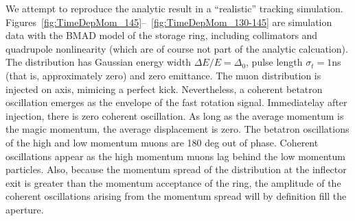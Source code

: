 \documentclass[10pt]{article}
\begin{document}
We attempt to reproduce the analytic result in a ``realistic'' tracking simulation. Figures~\ref{fig:TimeDepMom_145}--~\ref{fig:TimeDepMom_130-145} are simulation data
with the BMAD model of the storage ring, including collimators and quadrupole nonlinearity (which are of course not part of the analytic calcuation). 
The distribution 
has Gaussian energy width $\Delta E/E=\Delta_0$, pulse length
$\sigma_t=1$ns (that is, approximately zero) and zero emittance. The muon distribution is injected on axis, mimicing a perfect kick. Nevertheless, 
a coherent betatron oscillation emerges as the envelope of the fast rotation signal. Immediatelay after injection, there is zero coherent oscillation.
As long as the average momentum is the magic momentum, the average displacement is zero. The betatron oscillations of the high and low momentum muons
are 180 deg out of phase. Coherent oscillations appear as the high momentum muons lag behind the low momentum particles. Also, because
the momentum spread of the distribution at the inflector exit is greater than the momentum acceptance of the ring, the amplitude of the coherent oscillations
arising from the momentum spread will by definition fill the aperture. 
\end{document}

